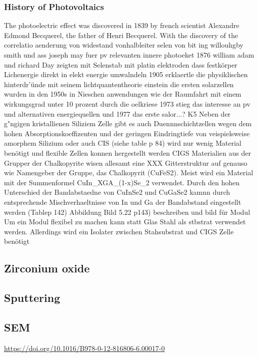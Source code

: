 \subsubsection{History of Photovoltaics}
The photoelectric effect was discovered in 1839 by french scientist Alexandre Edmond Becquerel\cite{becquerel1839memoire}, the father of Henri Becquerel. 
With the discovery of the correlatio
aenderung von widestand vonhalbleiter selen von bit ing willouhgby smith und ass joseph may fuer pv relevanten innere photoeket
1876 william adam und richard Day zeigten mit Selenstab mit platin elektroden dass festkörper Lichenergie direkt in elekt energie umwalndeln 
1905 erklaertle die physiklischen hinterdr'ünde mit seinem lichtquantentheorie einstein 
die ersten solarzellen wurden in den 1950s in Nieschen anwendungen wie der Raumfahrt mit einem wirkungsgrad unter 10 prozent 
durch die oelkriese 1973 stieg das interesse an pv und alternativen energiequellen und 1977 das erste salor...? 
K5
Neben der g"ngigen kristallienen Siliziem Zelle gibt es auch Duennnschichtzellen
wegen dem hohen Absorptionskoeffizenten und der geringen Eindringtiefe von veispielsweise amorphem Silizium oder auch CIS (siehe table p 84) wird nur wenig Material benötigt und flexible Zellen konnen hergestellt werden 
CIGS 
Materialien aus der Grupper der Chalkopyrite wisen allesamt eine XXX Gitterstruktur auf genauso wie Namengeber der Gruppe, das Chalkopyrit (CuFeS2). Meist wird ein Material mit der Summenformel CuIn_XGA_{(1-x)}Se_2 verwendet. Durch den hohen Unterschied der Bandabstaedne von CuInSe2 und CuGaSe2 kamnn durch entsprechende Mischverhaeltnisse von In und Ga der Bandabstand eingestellt werden (Tablep 142) Abbildung Bild 5.22 p143) beschreiben und bild für Modul 
Um ein Modul flexibel zu machen kann statt Glas Stahl als stbstrat verwendet werden. Allerdings wird ein Isolater zwischen Stahsubstrat und CIGS Zelle benötigt


\subsection{Zirconium oxide}
\subsection{Sputtering}
\subsection{SEM}
\url{https://doi.org/10.1016/B978-0-12-816806-6.00017-0}\\
